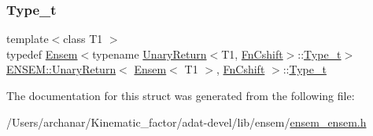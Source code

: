 \mbox{\label{structENSEM_1_1UnaryReturn_3_01Ensem_3_01T1_01_4_00_01FnCshift_01_4_a1adec9b456e13e2aebde180312ff6235}} 
\subsubsection{\texorpdfstring{Type\_t}{Type\_t}\hspace{0.1cm}{\footnotesize\ttfamily [3/3]}}
{\footnotesize\ttfamily template$<$class T1 $>$ \\
typedef \mbox{\hyperlink{classENSEM_1_1Ensem}{Ensem}}$<$typename \mbox{\hyperlink{structENSEM_1_1UnaryReturn}{Unary\+Return}}$<$T1, \mbox{\hyperlink{structENSEM_1_1FnCshift}{Fn\+Cshift}}$>$\+::\mbox{\hyperlink{structENSEM_1_1UnaryReturn_3_01Ensem_3_01T1_01_4_00_01FnCshift_01_4_a1adec9b456e13e2aebde180312ff6235}{Type\+\_\+t}}$>$ \mbox{\hyperlink{structENSEM_1_1UnaryReturn}{E\+N\+S\+E\+M\+::\+Unary\+Return}}$<$ \mbox{\hyperlink{classENSEM_1_1Ensem}{Ensem}}$<$ T1 $>$, \mbox{\hyperlink{structENSEM_1_1FnCshift}{Fn\+Cshift}} $>$\+::\mbox{\hyperlink{structENSEM_1_1UnaryReturn_3_01Ensem_3_01T1_01_4_00_01FnCshift_01_4_a1adec9b456e13e2aebde180312ff6235}{Type\+\_\+t}}}



The documentation for this struct was generated from the following file\+:\begin{DoxyCompactItemize}
\item 
/\+Users/archanar/\+Kinematic\+\_\+factor/adat-\/devel/lib/ensem/\mbox{\hyperlink{adat-devel_2lib_2ensem_2ensem__ensem_8h}{ensem\+\_\+ensem.\+h}}\end{DoxyCompactItemize}
